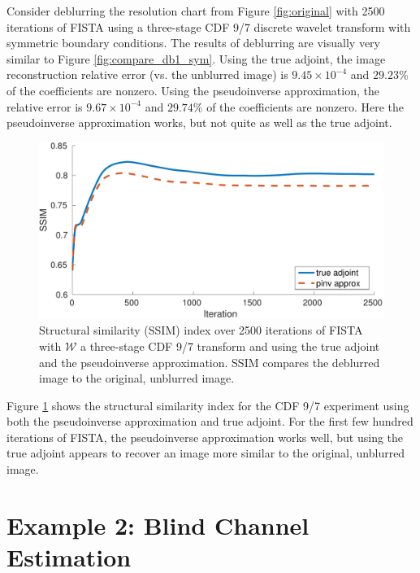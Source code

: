 \documentclass[journal]{IEEEtran}
\begin{document}
Consider deblurring the resolution chart from Figure \ref{fig:original} with 2500 iterations of FISTA using a three-stage CDF 9/7 discrete wavelet transform with symmetric boundary conditions.  The results of deblurring are visually very similar to Figure \ref{fig:compare_db1_sym}.  Using the true adjoint, the image reconstruction relative error (vs. the unblurred image) is $9.45\times 10^{-4}$ and $29.23\%$ of the coefficients are nonzero.  Using the pseudoinverse approximation, the relative error is $9.67\times 10^{-4}$ and $29.74\%$ of the coefficients are nonzero.  Here the pseudoinverse approximation works, but not quite as well as the true adjoint.

\begin{figure}
   \centering
   \includegraphics[width=\columnwidth]{fig3.pdf}
   \caption{Structural similarity (SSIM) index over 2500 iterations of FISTA with $\mathcal{W}$ a three-stage CDF 9/7 transform and using the true adjoint and the pseudoinverse approximation.  SSIM compares the deblurred image to the original, unblurred image.}
   \label{fig:adjoint_convergence}
\end{figure}

Figure \ref{fig:adjoint_convergence} shows the structural similarity index \cite{wang_2004} for the CDF 9/7 experiment using both the pseudoinverse approximation and true adjoint.  For the first few hundred iterations of FISTA, the pseudoinverse approximation works well, but using the true adjoint appears to recover an image more similar to the original, unblurred image.



\section{Example 2: Blind Channel Estimation}
\end{document}
